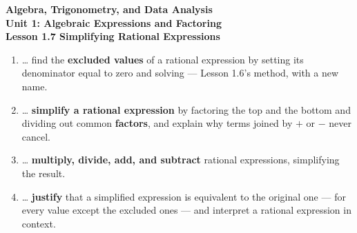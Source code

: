 \documentclass[10pt]{article}
\begin{document}
\vspace{-0.8in}

\begin{center}
  {\color{white}\textbf{\LARGE Algebra, Trigonometry, and Data Analysis}}\\[4pt]
  {\color{mistmid}\large\textbf{Unit 1: Algebraic Expressions and Factoring}}\\[6pt]
  {\color{white}\textbf{\large Lesson 1.7 \quad Simplifying Rational Expressions}}
\end{center}

\vspace{0.22in}
\namedateperiod
\vspace{0.18in}

\begin{learningtargetbox}
\small
\begin{enumerate}[leftmargin=1.5em, itemsep=5pt]
  \item \ldots{} find the \textbf{excluded values} of a rational expression by setting its
        denominator equal to zero and solving --- Lesson 1.6's method, with a new name.
  \item \ldots{} \textbf{simplify a rational expression} by factoring the top and the bottom and
        dividing out common \textbf{factors}, and explain why terms joined by $+$ or $-$ never
        cancel.
  \item \ldots{} \textbf{multiply, divide, add, and subtract} rational expressions, simplifying the
        result.
  \item \ldots{} \textbf{justify} that a simplified expression is equivalent to the original one ---
        for every value except the excluded ones --- and interpret a rational expression in context.
\end{enumerate}
\end{learningtargetbox}

\vspace{0.14in}
\end{document}
